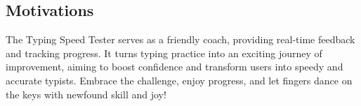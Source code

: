  
\subsection{Motivations}

The Typing Speed Tester serves as a friendly coach, providing real-time feedback and tracking progress. It turns typing practice into an exciting journey of improvement, aiming to boost confidence and transform users into speedy and accurate typists. Embrace the challenge, enjoy progress, and let fingers dance on the keys with newfound skill and joy!





     
    
     
     
